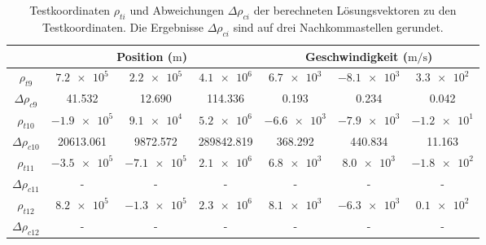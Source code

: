 \documentclass[a4paper,12pt]{article}
\numberwithin{equation}{section}
\begin{document}
\begin{table}[ht]
\renewcommand{\arraystretch}{1.1}
\centering
\begin{tabular}{|c|c|c|c|c|c|c|}
\cline{2-7}
\multicolumn{1}{c|}{} & \multicolumn{3}{c|}{Position ($\si{\meter}$)} & \multicolumn{3}{c|}{Geschwindigkeit ($\si{\meter\per\second}$)} \\
\cline{2-7}\hline
$\rho_{t9}$ & $\num{7.2e5}$ & $\num{2.2e5}$ & $\num{4.1e6}$ & $\num{6.7e3} $ & $\num{-8.1e3}$ & $\num{3.3e2}$ \\
$\Delta \rho_{c9}$ & 41.532 & 12.690 & 114.336 & 0.193 & 0.234 & 0.042 \\
\hline
$\rho_{t10}$ & $\num{-1.9e5}$ & $\num{9.1e4}$ & $\num{5.2e6}$ & $\num{-6.6e3}$ & $\num{-7.9e3}$ & $\num{-1.2e1}$ \\
$\Delta \rho_{c10}$ & 20613.061 & 9872.572 & 289842.819 & 368.292 & 440.834 & 11.163 \\
\hline
$\rho_{t11}$ & $\num{-3.5e5}$ & $\num{-7.1e5}$ & $\num{2.1e6}$ & $\num{6.8e3}$ & $\num{8.0e3}$ & $\num{-1.8e2}$ \\
$\Delta \rho_{c11}$ & - & - & - & - & - & - \\
\hline
$\rho_{t12}$ & $\num{8.2e5}$ & $\num{-1.3e5}$ & $\num{2.3e6}$ & $\num{8.1e3}$ & $\num{-6.3e3}$ & $\num{0.1e2}$ \\
$\Delta \rho_{c12}$ & - & - & - & - & - & - \\
\hline
\end{tabular}
\caption{Testkoordinaten $\rho_{ti}$ und Abweichungen $\Delta \rho_{ci}$ der berechneten Lösungsvektoren zu den Testkoordinaten. Die Ergebnisse $\Delta \rho_{ci}$ sind auf drei Nachkommastellen gerundet.}
\label{tab:testconfig3}
\end{table}
\end{document}
